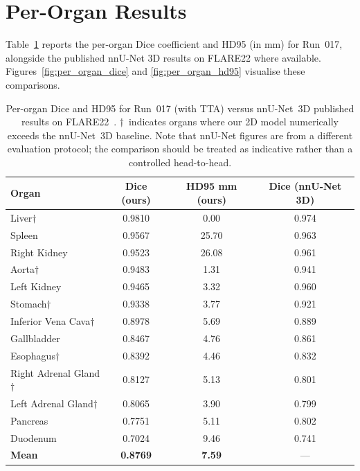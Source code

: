 \section{Per-Organ Results}

Table~\ref{tab:per_organ} reports the per-organ Dice coefficient and HD95 (in mm) for Run~017, alongside the published nnU-Net 3D results on FLARE22 where available. Figures~\ref{fig:per_organ_dice} and \ref{fig:per_organ_hd95} visualise these comparisons.

\begin{table}[h!]
\centering
\caption{Per-organ Dice and HD95 for Run~017 (with TTA) versus nnU-Net~3D published
         results on FLARE22~\cite{isensee2021}. $\dagger$~indicates organs where our
         2D model numerically exceeds the nnU-Net~3D baseline. Note that nnU-Net figures
         are from a different evaluation protocol; the comparison should be treated as
         indicative rather than a controlled head-to-head.}
\label{tab:per_organ}
\begin{tabular}{l c c c}
\toprule
\textbf{Organ} & \textbf{Dice (ours)} & \textbf{HD95 mm (ours)} & \textbf{Dice (nnU-Net 3D)} \\
\midrule
Liver$\dagger$              & 0.9810 & \phantom{0}0.00 & 0.974 \\
Spleen                      & 0.9567 & 25.70           & 0.963 \\
Right Kidney                & 0.9523 & 26.08           & 0.961 \\
Aorta$\dagger$              & 0.9483 & \phantom{0}1.31 & 0.941 \\
Left Kidney                 & 0.9465 & \phantom{0}3.32 & 0.960 \\
Stomach$\dagger$            & 0.9338 & \phantom{0}3.77 & 0.921 \\
Inferior Vena Cava$\dagger$ & 0.8978 & \phantom{0}5.69 & 0.889 \\
Gallbladder                 & 0.8467 & \phantom{0}4.76 & 0.861 \\
Esophagus$\dagger$          & 0.8392 & \phantom{0}4.46 & 0.832 \\
Right Adrenal Gland$\dagger$& 0.8127 & \phantom{0}5.13 & 0.801 \\
Left Adrenal Gland$\dagger$ & 0.8065 & \phantom{0}3.90 & 0.799 \\
Pancreas                    & 0.7751 & \phantom{0}5.11 & 0.802 \\
Duodenum                    & 0.7024 & \phantom{0}9.46 & 0.741 \\
\midrule
\textbf{Mean}               & \textbf{0.8769} & \textbf{7.59} & --- \\
\bottomrule
\end{tabular}
\end{table}

